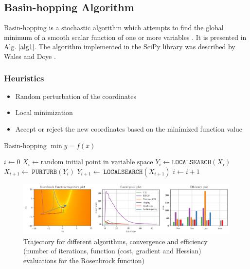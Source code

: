 \documentclass[conference]{IEEEtran}
\begin{document}
\subsection{Basin-hopping Algorithm}

Basin-hopping is a stochastic algorithm which attempts to find the global minimum of a smooth scalar function of one or more variables \cite{b6}. It is presented in Alg. \ref{alg1}. The algorithm  implemented in the SciPy library was described by Wales and Doye \cite{b5}.

\subsubsection{Heuristics}
\begin{itemize}
	\item Random perturbation of the coordinates
	\item Local minimization
	\item Accept or reject the new coordinates based on the minimized function value
\end{itemize}

\begin{algorithm} %
\caption{Basin-hopping $\min y = f(x)$ \cite{b6}} %
\label{alg1} %
\begin{algorithmic} %
    \STATE $i \leftarrow 0$
	\STATE $X_i \leftarrow \text{random initial point in variable space}$
	\STATE $Y_i \leftarrow \texttt{LOCALSEARCH}(X_i)$
		\STATE $X_{i+1} \leftarrow \ \texttt{PURTURB}(Y_i)$
		\STATE $Y_{i+1} \leftarrow \ \texttt{LOCALSEARCH}(X_{i+1})$
            \STATE $i \leftarrow i+1$
        \ENDIF
    \ENDWHILE
\end{algorithmic}
\end{algorithm}

\begin{figure}[htbp]
\centerline{\includegraphics[width=\textwidth]{convergence.png}}
\caption{Trajectory for different algorithms, convergence and efficiency (number of iterations, function (cost, gradient and Hessian) evaluations for the Rosenbrock function)}
\label{convergence}
\end{figure}
\end{document}
